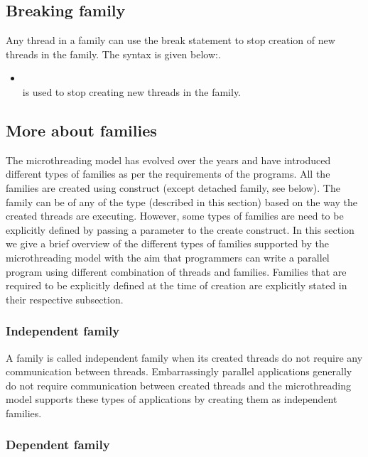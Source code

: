 \documentclass{article}
\begin{document}
\subsection*{Breaking family}

Any thread in a family can use the break statement to stop creation of new threads
in the family. The syntax is given below:.

\begin{itemize}
\item  \\is used to stop creating new threads in the family.
\end{itemize}

\subsection{More about families}

The microthreading model has evolved over the years and have introduced
different types of families as per the requirements of the programs. All the
families are created using  construct (except detached family, see
below). The family can be of any of the type (described in this section)
based on the way the created threads are executing. However, some types of
families are need to be explicitly defined by passing a parameter to the create
construct. In this section we give a brief overview of the different types of
families supported by the microthreading model with the aim that programmers
can write a parallel program using different combination of threads and
families. Families that are required to be explicitly defined at the time of
creation are explicitly stated in their respective subsection.

\subsubsection*{Independent family}

A family is called independent family when its created threads do not require
any communication between threads. Embarrassingly parallel applications
generally do not require communication between created threads and the
microthreading model supports these types of applications by creating them as
independent families.

\subsubsection*{Dependent family}
\end{document}
